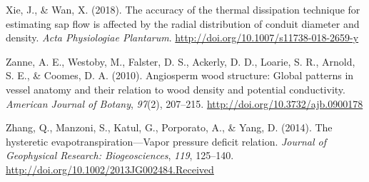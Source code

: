 \documentclass[11pt,twoside]{reedthesis}
\begin{document}
\hypertarget{ref-Xie2018}{}
Xie, J., \& Wan, X. (2018). The accuracy of the thermal dissipation
technique for estimating sap flow is affected by the radial distribution
of conduit diameter and density. \emph{Acta Physiologiae Plantarum}.
\url{http://doi.org/10.1007/s11738-018-2659-y}

\hypertarget{ref-Zanne2010}{}
Zanne, A. E., Westoby, M., Falster, D. S., Ackerly, D. D., Loarie, S.
R., Arnold, S. E., \& Coomes, D. A. (2010). Angiosperm wood structure:
Global patterns in vessel anatomy and their relation to wood density and
potential conductivity. \emph{American Journal of Botany}, \emph{97}(2),
207--215. \url{http://doi.org/10.3732/ajb.0900178}

\hypertarget{ref-Zhang2014}{}
Zhang, Q., Manzoni, S., Katul, G., Porporato, A., \& Yang, D. (2014).
The hysteretic evapotranspiration---Vapor pressure deficit relation.
\emph{Journal of Geophysical Research: Biogeosciences}, \emph{119},
125--140. \url{http://doi.org/10.1002/2013JG002484.Received}


\end{document}
